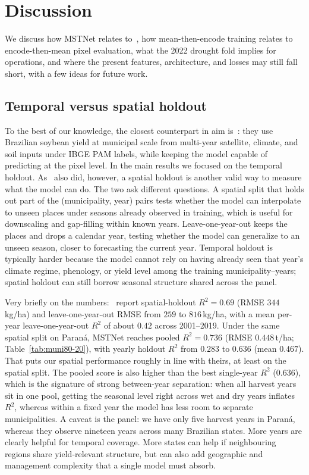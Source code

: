 \section{Discussion}
\label{sec:discussion}

We discuss how MSTNet relates to~\citet{song2022soy}, how mean-then-encode training relates to encode-then-mean pixel evaluation, what the 2022 drought fold implies for operations, and where the present features, architecture, and losses may still fall short, with a few ideas for future work.

\subsection{Temporal versus spatial holdout}
\label{sec:discussion-yoo-vs-muni}

To the best of our knowledge, the closest counterpart in aim is~\citet{song2022soy}: they use Brazilian soybean yield at municipal scale from multi-year satellite, climate, and soil inputs under IBGE PAM labels, while keeping the model capable of predicting at the pixel level.
In the main results we focused on the temporal holdout.
As~\citet{song2022soy} also did, however, a spatial holdout is another valid way to measure what the model can do.
The two ask different questions.
A spatial split that holds out part of the (municipality, year) pairs tests whether the model can interpolate to unseen places under seasons already observed in training, which is useful for downscaling and gap-filling within known years.
Leave-one-year-out keeps the places and drops a calendar year, testing whether the model can generalize to an unseen season, closer to forecasting the current year.
Temporal holdout is typically harder because the model cannot rely on having already seen that year's climate regime, phenology, or yield level among the training municipality--years; spatial holdout can still borrow seasonal structure shared across the panel.

Very briefly on the numbers:~\citet{song2022soy} report spatial-holdout $R^2=0.69$ (RMSE $344$\,\si{kg/ha}) and leave-one-year-out RMSE from $259$ to $816$\,\si{kg/ha}, with a mean per-year leave-one-year-out $R^2$ of about $0.42$ across 2001--2019.
Under the same spatial split on Paran\'{a}, MSTNet reaches pooled $R^2=0.736$ (RMSE $0.448$\,\si{t/ha}; Table~\ref{tab:muni80-20}), with yearly holdout $R^2$ from $0.283$ to $0.636$ (mean $0.467$).
That puts our spatial performance roughly in line with theirs, at least on the spatial split.
The pooled score is also higher than the best single-year $R^2$ ($0.636$), which is the signature of strong between-year separation: when all harvest years sit in one pool, getting the seasonal level right across wet and dry years inflates $R^2$, whereas within a fixed year the model has less room to separate municipalities.
A caveat is the panel: we have only five harvest years in Paran\'{a}, whereas they observe nineteen years across many Brazilian states.
More years are clearly helpful for temporal coverage.
More states can help if neighbouring regions share yield-relevant structure, but can also add geographic and management complexity that a single model must absorb.


